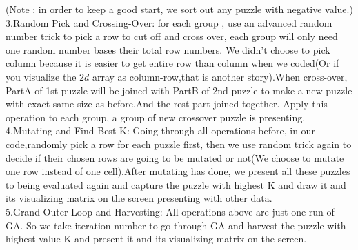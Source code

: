 \documentclass[12pt, letterpaper]{article}
\begin{document}
	(Note : in order to keep a good start, we sort out any puzzle with negative value.)\\
	
	3.Random Pick and Crossing-Over: for each group , use an advanced random number trick to pick a row to cut off and cross over, each group will only need one random number bases their total row numbers. We didn't choose to pick column because it is easier to get entire row than column when we coded(Or if you visualize the $2d$ array as column-row,that is another story).When cross-over, PartA of 1st puzzle will be joined with PartB of 2nd puzzle to make a new puzzle with exact same size as before.And the rest part joined together. Apply this operation to each group, a group of new crossover puzzle is presenting.\\
	
	4.Mutating and Find Best K: Going through all operations before, in our code,randomly pick a row for each puzzle first, then we use random trick again to decide if their chosen rows are going to be mutated or not(We choose to mutate one row instead of one cell).After mutating has done, we present all these puzzles to being evaluated again and capture the puzzle with highest K and draw it and its visualizing matrix on the screen presenting with other data.\\
	
	5.Grand Outer Loop and Harvesting: All operations above are just one run of GA. So we take iteration number to go through GA and harvest the puzzle with highest value K and present it and its visualizing matrix on the screen.\\
\end{document}
